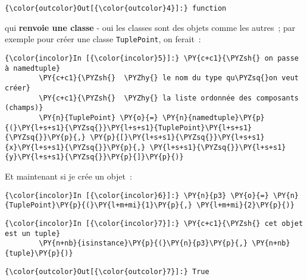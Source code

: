 \begin{Verbatim}[commandchars=\\\{\},frame=single,framerule=0.3mm,rulecolor=\color{cellframecolor}]
{\color{outcolor}Out[{\color{outcolor}4}]:} function
\end{Verbatim}
            
    qui \textbf{renvoie une classe} - oui les classes sont des objets comme
les autres~; par exemple pour créer une classe \texttt{TuplePoint}, on
ferait~:

    \begin{Verbatim}[commandchars=\\\{\},frame=single,framerule=0.3mm,rulecolor=\color{cellframecolor}]
{\color{incolor}In [{\color{incolor}5}]:} \PY{c+c1}{\PYZsh{} on passe à namedtuple}
        \PY{c+c1}{\PYZsh{}  \PYZhy{} le nom du type qu\PYZsq{}on veut créer}
        \PY{c+c1}{\PYZsh{}  \PYZhy{} la liste ordonnée des composants (champs)}
        \PY{n}{TuplePoint} \PY{o}{=} \PY{n}{namedtuple}\PY{p}{(}\PY{l+s+s1}{\PYZsq{}}\PY{l+s+s1}{TuplePoint}\PY{l+s+s1}{\PYZsq{}}\PY{p}{,} \PY{p}{[}\PY{l+s+s1}{\PYZsq{}}\PY{l+s+s1}{x}\PY{l+s+s1}{\PYZsq{}}\PY{p}{,} \PY{l+s+s1}{\PYZsq{}}\PY{l+s+s1}{y}\PY{l+s+s1}{\PYZsq{}}\PY{p}{]}\PY{p}{)}
\end{Verbatim}


    Et maintenant si je crée un objet~:

    \begin{Verbatim}[commandchars=\\\{\},frame=single,framerule=0.3mm,rulecolor=\color{cellframecolor}]
{\color{incolor}In [{\color{incolor}6}]:} \PY{n}{p3} \PY{o}{=} \PY{n}{TuplePoint}\PY{p}{(}\PY{l+m+mi}{1}\PY{p}{,} \PY{l+m+mi}{2}\PY{p}{)}
\end{Verbatim}


    \begin{Verbatim}[commandchars=\\\{\},frame=single,framerule=0.3mm,rulecolor=\color{cellframecolor}]
{\color{incolor}In [{\color{incolor}7}]:} \PY{c+c1}{\PYZsh{} cet objet est un tuple}
        \PY{n+nb}{isinstance}\PY{p}{(}\PY{n}{p3}\PY{p}{,} \PY{n+nb}{tuple}\PY{p}{)}
\end{Verbatim}


\begin{Verbatim}[commandchars=\\\{\},frame=single,framerule=0.3mm,rulecolor=\color{cellframecolor}]
{\color{outcolor}Out[{\color{outcolor}7}]:} True
\end{Verbatim}
            
